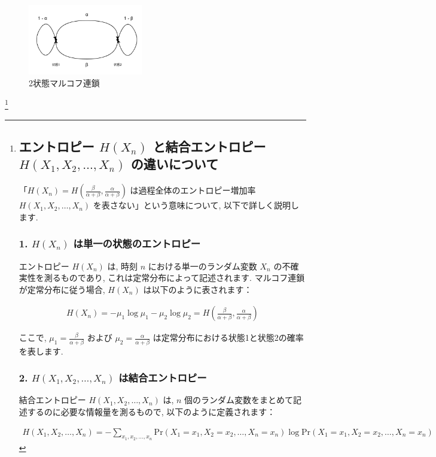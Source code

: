 \documentclass[a4j]{jsarticle}
\begin{document}
\begin{figure}[H]
	\centering
	\includegraphics[width = 5.0cm]{example1.8.png}
	\caption{2状態マルコフ連鎖}
	\label{example-1.8}
\end{figure}
\footnote{
	\subsection*{エントロピー $H(X_n)$ と結合エントロピー $H(X_1, X_2, \ldots, X_n)$ の違いについて}

	「$H(X_n) = H\left(\frac{\beta}{\alpha + \beta}, \frac{\alpha}{\alpha + \beta}\right)$ は過程全体のエントロピー増加率 $H(X_1, X_2, \ldots, X_n)$ を表さない」という意味について, 以下で詳しく説明します.

	\subsubsection*{1. $H(X_n)$ は単一の状態のエントロピー}
	エントロピー $H(X_n)$ は, 時刻 $n$ における単一のランダム変数 $X_n$ の不確実性を測るものであり, これは定常分布によって記述されます. マルコフ連鎖が定常分布に従う場合, $H(X_n)$ は以下のように表されます：

	\begin{align*}
		H(X_n) = -\mu_1 \log \mu_1 - \mu_2 \log \mu_2 = H\left(\frac{\beta}{\alpha + \beta}, \frac{\alpha}{\alpha + \beta}\right)
	\end{align*}

	ここで, $\mu_1 = \frac{\beta}{\alpha + \beta}$ および $\mu_2 = \frac{\alpha}{\alpha + \beta}$ は定常分布における状態1と状態2の確率を表します.

	\subsubsection*{2. $H(X_1, X_2, \ldots, X_n)$ は結合エントロピー}
	結合エントロピー $H(X_1, X_2, \ldots, X_n)$ は, $n$ 個のランダム変数をまとめて記述するのに必要な情報量を測るもので, 以下のように定義されます：

	\begin{align*}
		H(X_1, X_2, \ldots, X_n) = - \sum_{x_1, x_2, \ldots, x_n} \text{Pr}(X_1 = x_1, X_2 = x_2, \ldots, X_n = x_n) \log \text{Pr}(X_1 = x_1, X_2 = x_2, \ldots, X_n = x_n)
	\end{align*}

}
\end{document}
